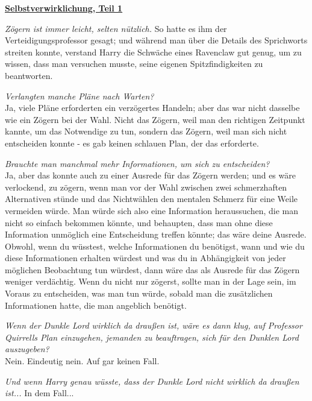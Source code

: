 

\hypertarget{selbstverwirklichung-teil-1}{%

\textbf{\uline{Selbstverwirklichung, Teil 1}}

\hfill\break \emph{Zögern ist immer leicht, selten nützlich.} So hatte es ihm der Verteidigungsprofessor gesagt; und während man über die Details des Sprichworts streiten konnte, verstand Harry die Schwäche eines Ravenclaw gut genug, um zu wissen, dass man versuchen musste, seine eigenen Spitzfindigkeiten zu beantworten.

\emph{Verlangten manche Pläne nach Warten?}\\ Ja, viele Pläne erforderten ein verzögertes Handeln; aber das war nicht dasselbe wie ein Zögern bei der Wahl. Nicht das Zögern, weil man den richtigen Zeitpunkt kannte, um das Notwendige zu tun, sondern das Zögern, weil man sich nicht entscheiden konnte - es gab keinen schlauen Plan, der das erforderte.

\emph{Brauchte man manchmal mehr Informationen, um sich zu entscheiden?}\\ Ja, aber das konnte auch zu einer Ausrede für das Zögern werden; und es wäre verlockend, zu zögern, wenn man vor der Wahl zwischen zwei schmerzhaften Alternativen stünde und das Nichtwählen den mentalen Schmerz für eine Weile vermeiden würde. Man würde sich also eine Information heraussuchen, die man nicht so einfach bekommen könnte, und behaupten, dass man ohne diese Information unmöglich eine Entscheidung treffen könnte; das wäre deine Ausrede. Obwohl, wenn du wüsstest, welche Informationen du benötigst, wann und wie du diese Informationen erhalten würdest und was du in Abhängigkeit von jeder möglichen Beobachtung tun würdest, dann wäre das als Ausrede für das Zögern weniger verdächtig. Wenn du nicht nur zögerst, sollte man in der Lage sein, im Voraus zu entscheiden, was man tun würde, sobald man die zusätzlichen Informationen hatte, die man angeblich benötigt.

\emph{Wenn der Dunkle Lord wirklich da draußen ist, wäre es dann klug, auf Professor Quirrells Plan einzugehen, jemanden zu beauftragen, sich für den Dunklen Lord auszugeben?}\\ Nein. Eindeutig nein. Auf gar keinen Fall.

\emph{Und wenn Harry genau wüsste, dass der Dunkle Lord nicht wirklich da draußen ist...} In dem Fall...

}
